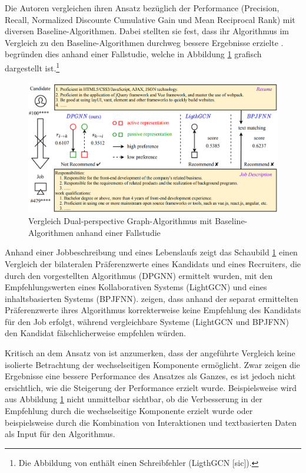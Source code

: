 Die Autoren vergleichen ihren Ansatz bezüglich der Performance (Precision, Recall, Normalized Discounte Cumulative Gain und Mean Reciprocal Rank) mit diversen Baseline-Algorithmen.
Dabei stellten sie fest, dass ihr Algorithmus im Vergleich zu den Baseline-Algorithmen durchweg bessere Ergebnisse erzielte \cite[S. 110]{yang:inproceedings}.
\textcite[S. 110]{yang:inproceedings} begründen dies anhand einer Fallstudie, welche in Abbildung \ref{fig:relatedwork:abb4} grafisch dargestellt ist.\footnote{Die Abbildung von \textcite[S. 111]{yang:inproceedings} enthält einen Schreibfehler (LigthGCN [sic]).}
\begin{figure}[H]
    \centering
	\includegraphics[width=1.0\textwidth]{gfx/dpg-case-study.png}
	\caption[Vergleich dual-perspective Graph-Algorithmus mit Baseline-Algorithmen anhand einer Fallstudie]{Vergleich Dual-perspective Graph-Algorithmus mit Baseline-Algo\-rithmen anhand einer Fallstudie\\
    \cite[S. 111]{yang:inproceedings}}
	\label{fig:relatedwork:abb4}
\end{figure}
Anhand einer Jobbeschreibung und eines Lebenslaufs zeigt das Schaubild \ref{fig:relatedwork:abb4} einen Vergleich der bilateralen Präferenzwerte eines Kandidats und eines Recruiters, die durch den vorgestellten Algorithmus (DPGNN) ermittelt wurden, mit den Empfehlungswerten eines Kollaborativen Systems (LightGCN) und eines inhaltsbasierten Systems (BPJFNN).
\textcite[S. 110]{yang:inproceedings} zeigen, dass anhand der separat ermittelten Präferenzwerte ihres Algorithmus korrekterweise keine Empfehlung des Kandidats für den Job erfolgt, während vergleichbare Systeme (LightGCN und BPJFNN) den Kandidat fälschlicherweise empfehlen würden.

Kritisch an dem Ansatz von \textcite[S. 102ff.]{yang:inproceedings} ist anzumerken, dass der angeführte Vergleich keine isolierte Betrachtung der wechselseitigen Komponente ermöglicht.
Zwar zeigen die Ergebnisse eine bessere Performance des Ansatzes als Ganzes, es ist jedoch nicht ersichtlich, wie die Steigerung der Performance erzielt wurde.
Beispielsweise wird aus Abbildung \ref{fig:relatedwork:abb4} nicht unmittelbar sichtbar, ob die Verbesserung in der Empfehlung durch die wechselseitige Komponente erzielt wurde oder beispielsweise durch die Kombination von Interaktionen und textbasierten Daten als Input für den Algorithmus.

